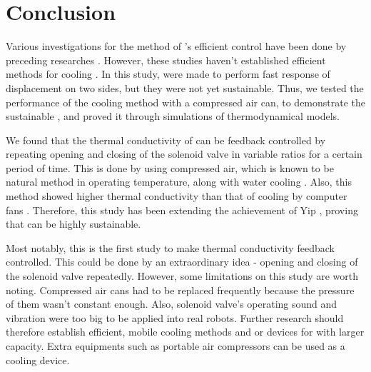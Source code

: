 \section{Conclusion}
Various investigations for the method of \scpnospace's efficient control have been done by preceding researches \cite{haines,mirvakili,yip}. %
However, these studies haven't established efficient methods for cooling \scpnospace. %
In this study, \antas were made to perform fast response of displacement on two sides, but they were not yet sustainable. Thus, we tested the performance of the cooling method with a compressed air can, to demonstrate the sustainable \apcnospace, and proved it through simulations of thermodynamical models. %

We found that the thermal conductivity of \scp can be feedback controlled by repeating opening and closing of the solenoid valve in variable ratios for a certain period of time. %
This is done by using compressed air, which is known to be natural method in operating temperature, along with water cooling \cite{madden}.
Also, this method showed higher thermal conductivity than that of cooling by computer fans \cite{yip}.
Therefore, this study has been extending the achievement of Yip \etal, proving that \apc can be highly sustainable.

Most notably, this is the first study to make thermal conductivity feedback controlled. This could be done by an extraordinary idea - opening and closing of the  solenoid valve repeatedly.
However, some limitations on this study are worth noting. 
Compressed air cans had to be replaced frequently because the pressure of them wasn't constant enough. 
Also, solenoid valve's operating sound and vibration were too big to be applied into real robots.
Further research should therefore establish efficient, mobile cooling methods and or devices for \scps with larger capacity. 
Extra equipments such as portable air compressors can be used as a cooling device.



